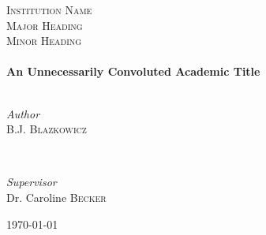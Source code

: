 \documentclass[
  11pt,
]{scrbook}
\begin{document}
\begin{frontmatter}
\begin{titlepage}
  	\textsc{\LARGE Institution Name}\\[1.5cm] %
  	
  	\textsc{\Large Major Heading}\\[0.5cm] %
  	
  	\textsc{\large Minor Heading}\\[0.5cm] %
  	
  	
  	\HRule\\[0.4cm]
  	
  	{\huge\bfseries An Unnecessarily Convoluted Academic Title}\\[0.4cm] %
  	
  	\HRule\\[1.5cm]
  	
  	
  	\begin{minipage}{0.4\textwidth}
  		\begin{flushleft}
  			\large
  			\textit{Author}\\
  			B.J. \textsc{Blazkowicz} %
  		\end{flushleft}
  	\end{minipage}
  	~
  	\begin{minipage}{0.4\textwidth}
  		\begin{flushright}
  			\large
  			\textit{Supervisor}\\
  			Dr. Caroline \textsc{Becker} %
  		\end{flushright}
  	\end{minipage}
  	
  	
  	
  	\vfill\vfill\vfill %
  	
  	{\large\today} %
  	

\end{titlepage}
\end{frontmatter}
\end{document}
